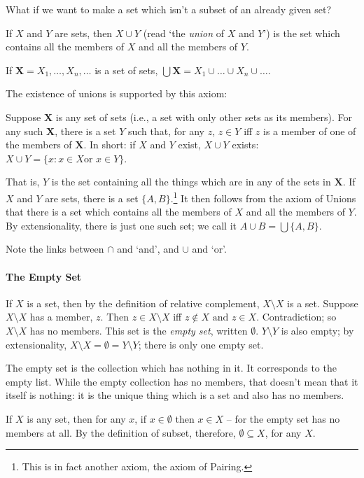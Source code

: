 What if we want to make a set which isn't a subset of an already given set?
\begin{definition}[Union] If $X$ and $Y$ are sets, then $X \cup Y$
    (read `the \emph{union} of $X$ and $Y$') is the set which contains all the members of $X$ and all the members of $Y$. 

If $\mathbf{X}=X_{1},\ldots,X_{n},\ldots$ is a set of sets, $\bigcup \mathbf{X} = X_{1} \cup \ldots \cup X_{n} \cup \ldots$.
\end{definition}
The existence of unions is supported by this axiom: \begin{axiom}[Unions]
  Suppose $\mathbf{X}$ is any set of sets (i.e., a set with only other sets as its members). For any such $\mathbf{X}$, there is a set $Y$ such that, for any $z$, $z\in Y$ iff $z$ is a member of one of the members of $\mathbf{X}$.  In short: if $X$ and $Y$ exist, $X\cup Y$ exists: $X \cup Y = \{x:x\in X \text{or } x \in Y\}$.  
\end{axiom} That is, $Y$ is the set containing all the things which are in any of the sets in $\mathbf{X}$. If $X$ and $Y$ are sets, there is a set $\{A,B\}$.\footnote{This is in fact another axiom, the axiom of Pairing.} It then follows from the axiom of Unions that there is a set which contains all the members of $X$ and all the members of $Y$. By extensionality, there is just one such set; we call it $A \cup B = \bigcup\{A,B\}$.

Note the links  between $\cap$ and `and', and $\cup$ and `or'.

\paragraph{The Empty Set}

If $X$ is a set, then by the definition of relative complement, $X\setminus X$ is a set. Suppose $X\setminus X$ has a member, $z$.  Then 	$z\in X\setminus X$ iff $z \notin X \text{ and } z \in X$. Contradiction; so $X\setminus X$ has no members. This set is the \emph{empty set}, written $\emptyset$. $Y\setminus Y$ is also empty; by extensionality, $X\setminus X=\emptyset=Y\setminus Y$; there is only one empty set.

The empty set is the collection which has nothing in it. It corresponds to the empty list. While the empty collection has no members, that doesn't mean that it itself is nothing: it is the unique thing which is a set and also has no members. 

 If $X$ is any set, then for any $x$, if $x \in \emptyset$ then $x\in X$ – for the empty set has no members at all. By the definition of subset, therefore, $\emptyset \subseteq X$, for any $X$.

